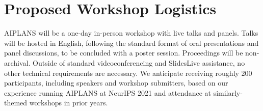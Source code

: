 \documentclass{article}
\begin{document}







    \section*{Proposed Workshop Logistics}

    AIPLANS will be a one-day in-person workshop with live talks and panels. Talks will be hosted in English, following the standard format of oral presentations and panel discussions, to be concluded with a poster session. Proceedings will be non-archival. Outside of standard videoconferencing and SlidesLive assistance, no other technical requirements are necessary. We anticipate receiving roughly 200 participants, including speakers and workshop submitters, based on our experience running AIPLANS at NeurIPS 2021 and attendance at similarly-themed workshops in prior years.

%
\end{document}
